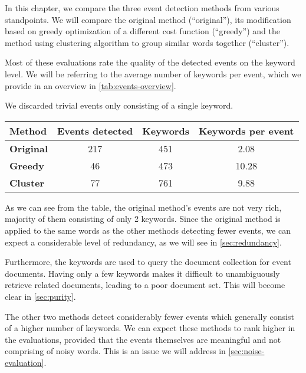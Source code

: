 In this chapter, we compare the three event detection methods from various standpoints. We will compare the original method (``original''), its modification based on greedy optimization of a different cost function (``greedy'') and the method using clustering algorithm to group similar words together (``cluster'').

Most of these evaluations rate the quality of the detected events on the keyword level. We will be referring to the average number of keywords per event, which we provide in an overview in \autoref{tab:events-overview}.

We discarded trivial events only consisting of a single keyword.

\hspace{\fill}

\begin{minipage}{\linewidth}
\centering
\begin{tabular}{ l c c c }\toprule[1.5pt]
\bf Method 	 & \bf Events detected & \bf Keywords & \bf Keywords per event \\ \midrule
\bf Original & 217 & 451 & 2.08 \\
\bf Greedy   & 46 & 473 & 10.28 \\
\bf Cluster & 77 & 761 & 9.88 \\ \bottomrule[1.25pt]
\end {tabular}\par
{} \label{tab:events-overview}
\end{minipage}

\hspace{\fill}

As we can see from the table, the original method's events are not very rich, majority of them consisting of only 2 keywords. Since the original method is applied to the same words as the other methods detecting fewer events, we can expect a considerable level of redundancy, as we will see in \autoref{sec:redundancy}.

Furthermore, the keywords are used to query the document collection for event documents. Having only a few keywords makes it difficult to unambiguously retrieve related documents, leading to a poor document set. This will become clear in \autoref{sec:purity}.

The other two methods detect considerably fewer events which generally consist of a higher number of keywords. We can expect these methods to rank higher in the evaluations, provided that the events themselves are meaningful and not comprising of noisy words. This is an issue we will address in \autoref{sec:noise-evaluation}.

